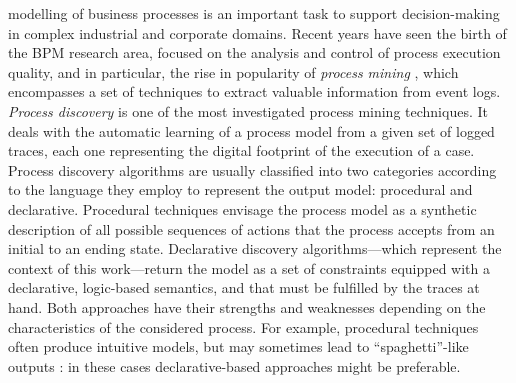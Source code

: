 
 modelling of business processes is an important task to support decision-making in complex industrial and corporate domains. Recent years have seen the birth of the \ac{BPM} research area, focused on the analysis and control of process execution quality, and in particular, the rise in popularity of \emph{process mining} \cite{2012-Aalst}, which encompasses a set of techniques to extract valuable information from event logs. 
%
\emph{Process discovery} is one of the most investigated process mining techniques. It deals with the automatic learning of a process model from a given set of logged traces, each one representing the digital footprint of the execution of a case. 
Process discovery algorithms are usually classified into two categories according to the language they employ to represent the output model: procedural and declarative.
Procedural techniques envisage the process model as a synthetic description of all possible sequences of actions that the process accepts from an initial to an ending state. Declarative discovery algorithms---which represent the context of this work---return the model as a set of constraints equipped with a declarative, logic-based semantics, and that must be fulfilled by the traces at hand. 
%
Both approaches have their strengths and weaknesses depending on the characteristics of the considered process. For example, procedural techniques often produce  intuitive models, but may sometimes lead to ``spaghetti''-like outputs \cite{2009-Fahland, 2018b-Maggi}: in these cases declarative-based approaches might be preferable.

